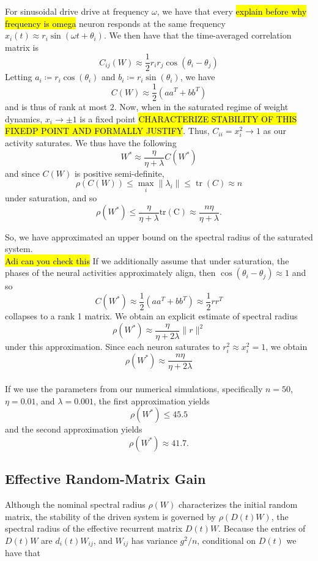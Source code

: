 \documentclass[paper=a4, fontsize=11pt]{scrartcl} %
\numberwithin{equation}{section} %
\numberwithin{figure}{section} %
\numberwithin{table}{section} %
\begin{document}
For sinusoidal drive drive at frequency $\omega$, we have that every \hl{explain before why frequency is omega} neuron responds at the same frequency $x_i(t) \approx r_i\sin(\omega t + \theta_i)$. We then have that the time-averaged correlation matrix is 
\[
C_{ij}(W) \approx \frac{1}{2}r_ir_j\cos(\theta_i - \theta_j)
\]
Letting $a_i \coloneq r_i\cos(\theta_i)$ and $b_i \coloneq r_i \sin (\theta_i)$, we have
\[
C(W) \approx \frac{1}{2}(aa^T + bb^T)
\]
and is thus of rank at most $2$. Now, when in the saturated regime of weight dynamics, $x_i \to \pm 1$ is a fixed point \hl{CHARACTERIZE STABILITY OF THIS FIXEDP POINT AND FORMALLY JUSTIFY}. Thus, $C_{ii} = x_i^2 \to 1$ as our activity saturates. We thus have the following
\[
W^{*} \approx \frac{\eta}{\eta + \lambda}C(W^*)
\]
and since $C(W)$ is positive semi-definite,
\[
\rho(C(W)) \le \max_i{\|\lambda_i\|} \le \operatorname{tr}(C) \approx n
\]
under saturation, and so 
\[
\rho(W^*) \le \frac{\eta}{\eta + \lambda}\operatorname{tr(C)} \approx \frac{n \eta}{\eta + \lambda}.
\]

So, we have approximated an upper bound on the spectral radius of the saturated system. \\

\hl{Adi can you check this} If we additionally assume that under saturation, the phases of the neural activities approximately align, then $\cos(\theta_i - \theta_j) \approx 1$ and so 
\[
C(W^*) \approx \frac{1}{2}(aa^T + bb^T) \approx \frac{1}{2}rr^T
\]
collapses to a rank 1 matrix. We obtain an explicit estimate of spectral radius
\[
\rho(W^*) \approx \frac{\eta}{\eta + 2\lambda}\|r\|^2
\]
under this approximation. Since each neuron saturates to $r_i^2 \approx x_i^2 = 1$, we obtain
\[
\rho(W^*) \approx \frac{n\eta}{\eta+ 2\lambda}
\]
\\

If we use the parameters from our numerical simulations, specifically $n=50$, $\eta = 0.01$, and $\lambda = 0.001$, the first approximation yields
\[
\rho(W^*) \le 45.5
\]
and the second approximation yields
\[\rho(W^*) \approx 41.7.\]

\subsection{Effective Random-Matrix Gain}
Although the nominal spectral radius $\rho(W)$ characterizes the initial random
matrix, the stability of the driven system is governed by $\rho(D(t)W)$, the
spectral radius of the effective recurrent matrix $D(t)W$.  Because the entries of
$D(t)W$ are $d_i(t) W_{ij}$, and $W_{ij}$ has variance $g^2/n$, conditional on
$D(t)$ we have that
\end{document}
